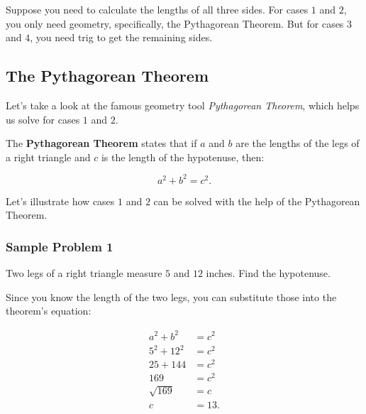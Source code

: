 Suppose you need to calculate the lengths of all three sides. For cases $1$ and
$2$, you only need geometry, specifically, the Pythagorean Theorem. But for
cases $3$ and $4$, you need trig to get the remaining sides.

\subsection{The Pythagorean Theorem}
\label{sub_sec:the_pythagorean_theorem}

Let's take a look at the famous geometry tool \textit{Pythagorean Theorem},
which helps us solve for cases $1$ and $2$.

\begin{theorem}
  \label{thrm:pythagorean_theorem}

  The \textbf{Pythagorean Theorem} states that if $a$ and $b$ are the lengths
  of the legs of a right triangle and $c$ is the length of the hypotenuse,
  then:

  \[ a^{2} + b^{2} = c^{2} . \]
\end{theorem}

Let's illustrate how cases $1$ and $2$ can be solved with the help of the
Pythagorean Theorem.

\subsubsection{Sample Problem 1}
\label{sub_sub_sec:sample_problem_1}

Two legs of a right triangle measure $5$ and $12$ inches. Find the hypotenuse.

\begin{figure}[htpb]
  \centering


  \label{fig:right_triangle_with_5_inch_and_12_inch}
\end{figure}

Since you know the length of the two legs, you can substitute those into the
theorem's equation:

\begin{align*}
  a^{2} + b^{2} &= c^{2} \\
  5^{2} + 12^{2} &= c^{2} \\
  25 + 144 &= c^{2} \\
  169 &= c^{2} \\
  \sqrt{169} &= c \\
  c &= 13
.\end{align*}

